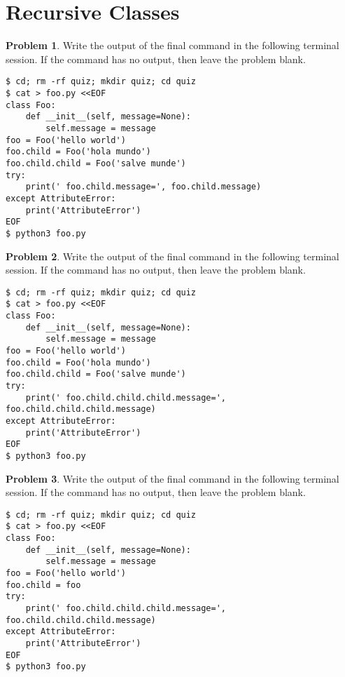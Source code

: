 \documentclass[10pt]{article}
\theoremstyle{definition}
\newtheorem{problem}{Problem}
\begin{document}

\section{Recursive Classes}

\filbreak
\begin{problem}
    Write the output of the final command in the following terminal session.
    If the command has no output, then leave the problem blank.
\end{problem}
\begin{lstlisting}
$ cd; rm -rf quiz; mkdir quiz; cd quiz
$ cat > foo.py <<EOF
class Foo:
    def __init__(self, message=None):
        self.message = message
foo = Foo('hello world')
foo.child = Foo('hola mundo')
foo.child.child = Foo('salve munde')
try:
    print(' foo.child.message=', foo.child.message)
except AttributeError:
    print('AttributeError') 
EOF
$ python3 foo.py
\end{lstlisting}

\filbreak
\begin{problem}
    Write the output of the final command in the following terminal session.
    If the command has no output, then leave the problem blank.
\end{problem}
\begin{lstlisting}
$ cd; rm -rf quiz; mkdir quiz; cd quiz
$ cat > foo.py <<EOF
class Foo:
    def __init__(self, message=None):
        self.message = message
foo = Foo('hello world')
foo.child = Foo('hola mundo')
foo.child.child = Foo('salve munde')
try:
    print(' foo.child.child.child.message=', foo.child.child.child.message)
except AttributeError:
    print('AttributeError') 
EOF
$ python3 foo.py
\end{lstlisting}


\filbreak
\begin{problem}
    Write the output of the final command in the following terminal session.
    If the command has no output, then leave the problem blank.
\end{problem}
\begin{lstlisting}
$ cd; rm -rf quiz; mkdir quiz; cd quiz
$ cat > foo.py <<EOF
class Foo:
    def __init__(self, message=None):
        self.message = message
foo = Foo('hello world')
foo.child = foo
try:
    print(' foo.child.child.child.message=', foo.child.child.child.message)
except AttributeError:
    print('AttributeError') 
EOF
$ python3 foo.py
\end{lstlisting}
\end{document}
